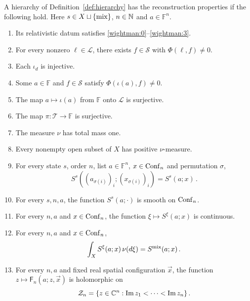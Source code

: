 \begin{definition}\label{def:reconstructed}
A hierarchy of Definition~\ref{def:hierarchy} has the reconstruction properties if the following hold.
Here $s\in X\sqcup\{\mathrm{mix}\}$, $n\in\mathbb N$ and $a\in\mathbb F^n$.
\begin{enumerate}[label=\textup{R\arabic*.},ref=R\arabic*]
\item\label{recon:1} Its relativistic datum satisfies \ref{wightman:0}--\ref{wightman:3}.
\item\label{recon:2} For every nonzero $\ell\in\mathcal L$, there exists $f\in\mathcal S$ with $\Phi(\ell,f)\ne0$.
\item\label{recon:3} Each $\iota_d$ is injective.
\item\label{recon:4} Some $a\in\mathbb F$ and $f\in\mathcal S$ satisfy $\Phi(\iota(a),f)\ne0$.
\item\label{recon:5} The map $a\mapsto\iota(a)$ from $\mathbb F$ onto $\mathcal L$ is surjective.
\item\label{recon:6} The map $\pi:\mathcal T\to\mathbb F$ is surjective.
\item\label{recon:7} The measure $\nu$ has total mass one.
\item\label{recon:8} Every nonempty open subset of $X$ has positive $\nu$-measure.
\item\label{recon:9} For every state $s$, order $n$, list $a\in\mathbb F^n$, $x\in\operatorname{Conf}_{n}$ and permutation $\sigma$,
\begin{equation}\label{eq:permutation}
S^s((a_{\sigma(i)})_i;(x_{\sigma(i)})_i)=S^s(a;x)\,.
\end{equation}
\item\label{recon:10} For every $s,n,a$, the function $S^s(a;\cdot)$ is smooth on $\operatorname{Conf}_{n}$.
\item\label{recon:11} For every $n,a$ and $x\in\operatorname{Conf}_{n}$, the function $\xi\mapsto S^\xi(a;x)$ is continuous.
\item\label{recon:12} For every $n,a$ and $x\in\operatorname{Conf}_{n}$,
\begin{equation}\label{eq:mixture}
\int_X S^\xi(a;x)\,\nu(d\xi)=S^{\mathrm{mix}}(a;x)\,.
\end{equation}
\item\label{recon:13} For every $n,a$ and fixed real spatial configuration $\vec x$, the function $z\mapsto\mathsf F_n(a;z,\vec x)$ is holomorphic on
\begin{equation}\label{eq:tube}
\mathcal Z_n=\{z\in\mathbb C^n:\operatorname{Im}z_1<\cdots<\operatorname{Im}z_n\}\,.
\end{equation}

\end{enumerate}
\end{definition}
